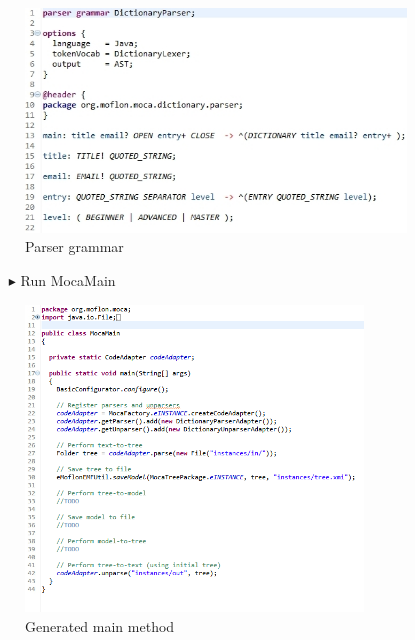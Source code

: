 \begin{figure}[htp]
\begin{center}
 \includegraphics[width=0.9\textwidth]{pics/moca/2TextToMocaTree/7-parser}
  \caption{Parser grammar}
  \label{moca-7-parser}
\end{center}
\end{figure}

\begin{enumerate}
\item[$\blacktriangleright$] Run MocaMain
\end{enumerate}

\begin{figure}[htp]
\begin{center}
 \includegraphics[width=0.8\textwidth]{pics/moca/2TextToMocaTree/8-MocaMain}
  \caption{Generated main method}
  \label{moca-8-MocaMain}
\end{center}
\end{figure}

